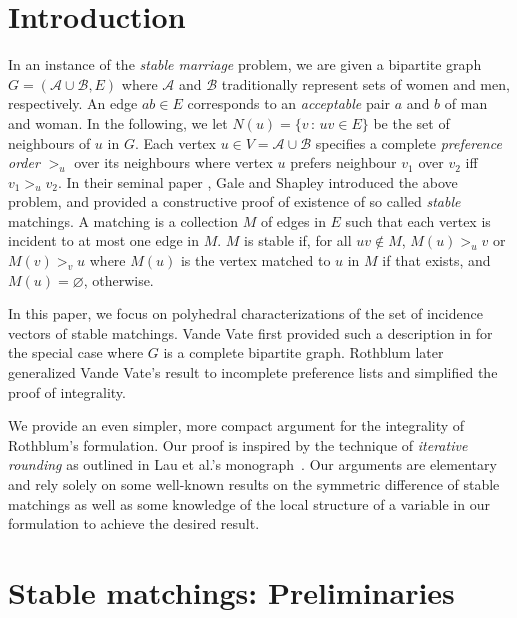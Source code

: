 \documentclass[3p,times]{elsarticle}
\newcommand{\cA}{\mathcal{A}} \newcommand{\cB}{\mathcal{B}}
\begin{document}
\section{Introduction}

In an instance of the {\em stable marriage} problem, we are given a
bipartite graph $G=(\cA \cup \cB, E)$ where $\cA$ and $\cB$
traditionally represent sets of women and men, respectively. An edge
$ab \in E$ corresponds to an {\em acceptable} pair $a$ and $b$ of man
and woman. In the following, we let $N(u) = \{ v \,:\, uv \in E \}$ be
the set of neighbours of $u$ in $G$. Each vertex
$u \in V=\cA \cup \cB$ specifies a complete {\em preference order}
$>_u$ over its neighbours where vertex $u$ prefers neighbour $v_1$
over $v_2$ iff $v_1 >_u v_2$.  In their seminal paper
\cite{gale1962college}, Gale and Shapley introduced the above problem,
and provided a constructive proof of existence of so called {\em
  stable} matchings. A matching is a collection $M$ of edges in $E$
such that each vertex is incident to at most one edge in $M$. $M$ is
stable if, for all $uv \not\in M$, $M(u) >_u v$ or $M(v) >_v u$ where
$M(u)$ is the vertex matched to $u$ in $M$ if that exists, and
$M(u)=\varnothing$, otherwise.

In this paper, we focus on polyhedral characterizations of the set of
incidence vectors of stable matchings.  Vande Vate first provided such
a description in \cite{vate1989linear} for the special case where $G$
is a complete bipartite graph.  Rothblum
\cite{rothblum1992characterization} later generalized Vande Vate's
result to incomplete preference lists and simplified the proof of
integrality.

We provide an even simpler, more compact argument for the integrality
of Rothblum's formulation. Our proof is inspired by the technique of
{\em iterative rounding} as outlined in Lau et al.'s
monograph~\cite{lau2011iterative}. Our arguments are elementary and
rely solely on some well-known results on the symmetric difference
of stable matchings as well as some knowledge of the local structure
of a variable in our formulation to achieve the desired result.

\section{Stable matchings: Preliminaries}
\end{document}
